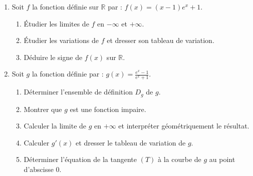 \documentclass[12pt,a4paper]{article}
\begin{document}
\begin{enumerate}[label=\arabic*.]
\item Soit $f$ la fonction définie sur $\mathbb{R}$ par : $f(x) = (x-1)e^x + 1$.
   \begin{enumerate}
   \item Étudier les limites de $f$ en $-\infty$ et $+\infty$.
   \item Étudier les variations de $f$ et dresser son tableau de variation.
   \item Déduire le signe de $f(x)$ sur $\mathbb{R}$.
   \end{enumerate}

\item Soit $g$ la fonction définie par : $g(x) = \frac{e^x - 1}{e^x + 1}$.
   \begin{enumerate}
   \item Déterminer l'ensemble de définition $D_g$ de $g$.
   \item Montrer que $g$ est une fonction impaire.
   \item Calculer la limite de $g$ en $+\infty$ et interpréter géométriquement le résultat.
   \item Calculer $g'(x)$ et dresser le tableau de variation de $g$.
   \item Déterminer l'équation de la tangente $(T)$ à la courbe de $g$ au point d'abscisse $0$.
   \end{enumerate}
\end{enumerate}
\end{document}
